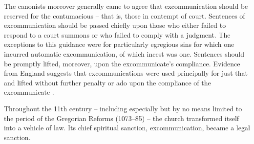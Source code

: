 \documentclass[12pt]{article}
\theoremstyle{definition}
\theoremstyle{remark}
\begin{document}
The canonists moreover generally came to agree that excommunication should be reserved for the contumacious -- that is, those in contempt of court. Sentences of excommunication should be passed chiefly upon those who either failed to respond to a court summons or who failed to comply with a judgment. The exceptions to this guidance were for particularly egregious sins for which one incurred automatic excommunication, of which incest was one. Sentences should be  promptly lifted, moreover, upon the excommunicate's compliance. Evidence from England suggests that excommunications were used principally for just that and lifted without further penalty or ado upon the compliance of the excommunicate \citep[214]{helmholz_1982}.

Throughout the 11th century -- including especially but by no means limited to the period of the Gregorian Reforms (1073--85) -- the church transformed itself into a vehicle of law. Its chief spiritual sanction, excommunication, became a legal sanction.
\end{document}
